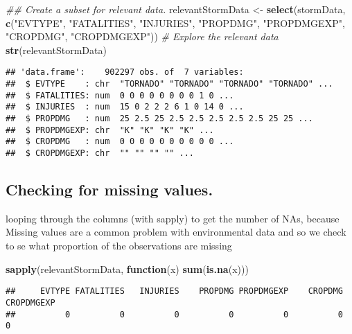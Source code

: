 \documentclass[
]{article}
\newenvironment{Shaded}{\begin{snugshade}}{\end{snugshade}}
\newcommand{\CommentTok}[1]{\textcolor[rgb]{0.56,0.35,0.01}{\textit{#1}}}
\newcommand{\ControlFlowTok}[1]{\textcolor[rgb]{0.13,0.29,0.53}{\textbf{#1}}}
\newcommand{\KeywordTok}[1]{\textcolor[rgb]{0.13,0.29,0.53}{\textbf{#1}}}
\newcommand{\NormalTok}[1]{#1}
\newcommand{\StringTok}[1]{\textcolor[rgb]{0.31,0.60,0.02}{#1}}
\begin{document}
\begin{Shaded}
\begin{Highlighting}[]
\CommentTok{## Create a subset for relevant data.}
\NormalTok{relevantStormData <-}\StringTok{ }\KeywordTok{select}\NormalTok{(stormData,  }\KeywordTok{c}\NormalTok{(}\StringTok{"EVTYPE"}\NormalTok{, }\StringTok{"FATALITIES"}\NormalTok{, }\StringTok{"INJURIES"}\NormalTok{, }\StringTok{"PROPDMG"}\NormalTok{, }\StringTok{"PROPDMGEXP"}\NormalTok{, }\StringTok{"CROPDMG"}\NormalTok{, }\StringTok{"CROPDMGEXP"}\NormalTok{))}
\CommentTok{# Explore the relevant data}
\KeywordTok{str}\NormalTok{(relevantStormData)}
\end{Highlighting}
\end{Shaded}

\begin{verbatim}
## 'data.frame':    902297 obs. of  7 variables:
##  $ EVTYPE    : chr  "TORNADO" "TORNADO" "TORNADO" "TORNADO" ...
##  $ FATALITIES: num  0 0 0 0 0 0 0 0 1 0 ...
##  $ INJURIES  : num  15 0 2 2 2 6 1 0 14 0 ...
##  $ PROPDMG   : num  25 2.5 25 2.5 2.5 2.5 2.5 2.5 25 25 ...
##  $ PROPDMGEXP: chr  "K" "K" "K" "K" ...
##  $ CROPDMG   : num  0 0 0 0 0 0 0 0 0 0 ...
##  $ CROPDMGEXP: chr  "" "" "" "" ...
\end{verbatim}

\hypertarget{checking-for-missing-values.}{%
\subsection{Checking for missing
values.}\label{checking-for-missing-values.}}

looping through the columns (with sapply) to get the number of NAs,
because Missing values are a common problem with environmental data and
so we check to se what proportion of the observations are missing

\begin{Shaded}
\begin{Highlighting}[]
\KeywordTok{sapply}\NormalTok{(relevantStormData, }\ControlFlowTok{function}\NormalTok{(x) }\KeywordTok{sum}\NormalTok{(}\KeywordTok{is.na}\NormalTok{(x)))}
\end{Highlighting}
\end{Shaded}

\begin{verbatim}
##     EVTYPE FATALITIES   INJURIES    PROPDMG PROPDMGEXP    CROPDMG CROPDMGEXP 
##          0          0          0          0          0          0          0
\end{verbatim}
\end{document}
